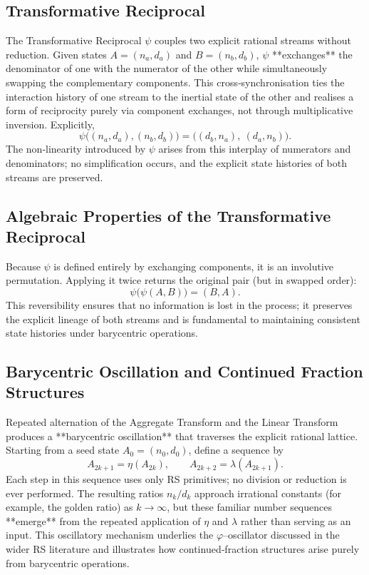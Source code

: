\documentclass[11pt, letterpaper]{article}
\newcommand{\psiOp}{\psi}
\newcommand{\etaOp}{\eta}
\newcommand{\lambdaOp}{\lambda}
\begin{document}
\subsection{Transformative Reciprocal}
The Transformative Reciprocal $\psiOp$ couples two explicit rational streams without reduction.  Given states $A=(n_a,d_a)$ and $B=(n_b,d_b)$, $\psiOp$ **exchanges** the denominator of one with the numerator of the other while simultaneously swapping the complementary components.  This cross‐synchronisation ties the interaction history of one stream to the inertial state of the other and realises a form of reciprocity purely via component exchanges, not through multiplicative inversion.  Explicitly,
\[
\psiOp\bigl((n_a,d_a),(n_b,d_b)\bigr) = \bigl((d_b,n_a),\ (d_a,n_b)\bigr).
\]
The non‐linearity introduced by $\psiOp$ arises from this interplay of numerators and denominators; no simplification occurs, and the explicit state histories of both streams are preserved.

\subsection{Algebraic Properties of the Transformative Reciprocal}
Because $\psiOp$ is defined entirely by exchanging components, it is an involutive permutation.  Applying it twice returns the original pair (but in swapped order):
\[
\psiOp\bigl(\psiOp(A,B)\bigr) = (B,A).
\]
This reversibility ensures that no information is lost in the process; it preserves the explicit lineage of both streams and is fundamental to maintaining consistent state histories under barycentric operations.

\subsection{Barycentric Oscillation and Continued Fraction Structures}
Repeated alternation of the Aggregate Transform and the Linear Transform produces a **barycentric oscillation** that traverses the explicit rational lattice.  Starting from a seed state $A_0=(n_0,d_0)$, define a sequence by
\[
A_{2k+1} = \etaOp(A_{2k}),\qquad A_{2k+2} = \lambdaOp(A_{2k+1}).
\]
Each step in this sequence uses only RS primitives; no division or reduction is ever performed.  The resulting ratios $n_k/d_k$ approach irrational constants (for example, the golden ratio) as $k\to\infty$, but these familiar number sequences **emerge** from the repeated application of $\etaOp$ and $\lambdaOp$ rather than serving as an input.  This oscillatory mechanism underlies the $\varphi$–oscillator discussed in the wider RS literature and illustrates how continued‐fraction structures arise purely from barycentric operations.
\end{document}
